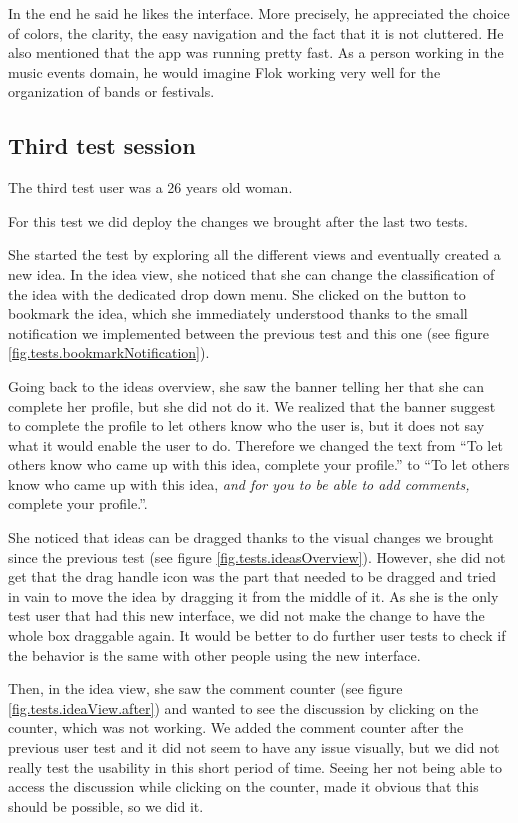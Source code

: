 \documentclass[a4paper,12pt, oneside]{article}
\begin{document}
In the end he said he likes the interface.
More precisely, he appreciated the choice of colors, the clarity, the easy navigation and the fact that it is not cluttered.
He also mentioned that the app was running pretty fast.
As a person working in the music events domain, he would imagine Flok working very well for the organization of bands or festivals.

\subsection{Third test session}
The third test user was a 26 years old woman.

For this test we did deploy the changes we brought after the last two tests.

She started the test by exploring all the different views and eventually created a new idea.
In the idea view, she noticed that she can change the classification of the idea with the dedicated drop down menu.
She clicked on the button to bookmark the idea, which she immediately understood thanks to the small notification we implemented between the previous test and this one (see figure \ref{fig.tests.bookmarkNotification}).

Going back to the ideas overview, she saw the banner telling her that she can complete her profile, but she did not do it.
We realized that the banner suggest to complete the profile to let others know who the user is, but it does not say what it would enable the user to do.
Therefore we changed the text from “To let others know who came up with this idea, complete your profile.” to “To let others know who came up with this idea, \emph{and for you to be able to add comments,} complete your profile.”.

She noticed that ideas can be dragged thanks to the visual changes we brought since the previous test (see figure \ref{fig.tests.ideasOverview}).
However, she did not get that the drag handle icon was the part that needed to be dragged and tried in vain to move the idea by dragging it from the middle of it.
As she is the only test user that had this new interface, we did not make the change to have the whole box draggable again.
It would be better to do further user tests to check if the behavior is the same with other people using the new interface.

Then, in the idea view, she saw the comment counter (see figure \ref{fig.tests.ideaView.after}) and wanted to see the discussion by clicking on the counter, which was not working.
We added the comment counter after the previous user test and it did not seem to have any issue visually, but we did not really test the usability in this short period of time.
Seeing her not being able to access the discussion while clicking on the counter, made it obvious that this should be possible, so we did it.
\end{document}

